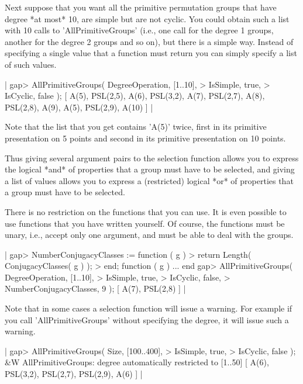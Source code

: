 Next suppose that you want all the primitive permutation groups that have
degree  *at most*  10,  are simple but are not cyclic.  You  could obtain
such a list with 10 calls to 'AllPrimitiveGroups' (i.e., one call for the
degree 1 groups, another for the degree 2 groups and so on), but there is
a simple  way.  Instead of specifying a single value that a function must
return you can simply specify a list of such values.

|    gap> AllPrimitiveGroups( DegreeOperation,   [1..10],
    >                        IsSimple,          true,
    >                        IsCyclic,          false );
    [ A(5), PSL(2,5), A(6), PSL(3,2), A(7), PSL(2,7), A(8), PSL(2,8),
      A(9), A(5), PSL(2,9), A(10) ] |

Note that  the  list that  you get  contains  'A(5)' twice,  first in its
primitive   presentation  on  5  points  and   second  in  its  primitive
presentation on 10 points.

Thus  giving several argument pairs  to the selection function allows you
to  express the logical *and* of properties that a group  must have to be
selected,  and  giving  a  list   of  values  allows  you  to  express  a
(restricted) logical *or*  of properties  that a  group must  have to  be
selected.

There  is  no restriction on the functions that  you can use.  It is even
possible to use functions that you have written yourself.  Of course, the
functions must be unary, i.e., accept only one argument, and must be able
to deal with the groups.

|    gap> NumberConjugacyClasses := function ( g )
    >        return Length( ConjugacyClasses( g ) );
    > end;
    function ( g ) ... end
    gap> AllPrimitiveGroups( DegreeOperation,           [1..10],
    >                        IsSimple,                  true,
    >                        IsCyclic,                  false,
    >                        NumberConjugacyClasses,    9 );
    [ A(7), PSL(2,8) ] |

Note that in some cases a selection function  will issue a warning.   For
example if you call 'AllPrimitiveGroups'  without  specifying the degree,
it will issue such a warning.

|    gap> AllPrimitiveGroups( Size,      [100..400],
    >                        IsSimple,  true,
    >                        IsCyclic,  false );
    &W  AllPrimitiveGroups: degree automatically restricted to [1..50]
    [ A(6), PSL(3,2), PSL(2,7), PSL(2,9), A(6) ] |

